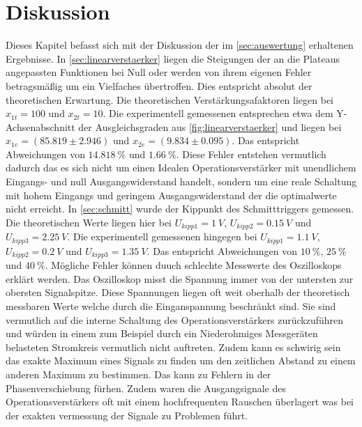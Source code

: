 

\section{Diskussion}
\label{sec:Diskussion}

Dieses Kapitel befasst sich mit der Diskussion der im \autoref{sec:auswertung} erhaltenen Ergebnisse.
In \autoref{sec:linearverstaerker} liegen die Steigungen der an die Plateaus angepassten Funktionen
bei Null oder werden von ihrem eigenen Fehler betragsmäßig um ein Vielfaches übertroffen. Dies entspricht
absolut der theoretischen Erwartung. Die theoretischen Verstärkungsafaktoren liegen bei $x_{1t}=100$ und
$x_{2t}=10$. Die experimentell gemessenen entsprechen etwa dem Y-Achsenabschnitt der Ausgleichsgraden aus
\autoref{fig:linearverstaerker} und liegen bei $x_{1e}=(85.819\pm 2.946)$ und $x_{2e}=(9.834 \pm 0.095)$.
Das entspricht Abweichungen von $\SI[]{14.818}[]{\%}$ und $\SI[]{1.66}[]{\%}$. Diese Fehler entstehen vermutlich
dadurch das es sich nicht um einen Idealen Operationsverstärker mit unendlichem Eingangs- und null 
Ausgangswiderstand handelt, sondern um eine reale Schaltung mit hohem Eingangs und geringem Ausgangswiderstand
der die optimalwerte nicht erreicht.
In \autoref{sec:schmitt} wurde der Kippunkt des Schmitttriggers gemessen.
Die theoretischen Werte liegen hier bei $U_{kipp1}=\SI[]{1}[]{V}$, $U_{kipp2}=\SI[]{0.15}[]{V}$ und $U_{kipp3}=\SI[]{2.25}[]{V}$.
Die experimentell gemessenen hingegen bei $U_{kipp1}=\SI[]{1.1}[]{V}$, $U_{kipp2}=\SI[]{0.2}[]{V}$ und $U_{kipp3}=\SI[]{1.35}[]{V}$.
Das entspricht Abweichungen von $\SI[]{10}[]{\%}$, $\SI[]{25}[]{\%}$ und $\SI[]{40}[]{\%}$. 
Mögliche Fehler können duuch schlechte Messwerte des Oszilloskops erklärt werden. Das Oszilloskop misst 
die Spannung immer von der untersten zur obersten Signalspitze. Diese Spannungen liegen oft weit oberhalb 
der theoretisch messbaren Werte welche durch die Einganspannung beschränkt sind. Sie sind vermutlich auf 
die interne Schaltung des Operationsverstärkers zurückzuführen und würden in einem zum Beispiel
durch ein Niederohmiges Messgeräten belasteten Stromkreis vermutlich nicht auftreten. Zudem kann es schwirig
sein das exakte Maximum eines Signals zu finden um den zeitlichen Abstand zu einem anderen Maximum zu bestimmen.
Das kann zu Fehlern in der Phasenverschiebung fürhen. Zudem waren die Ausgangsignale des Operationsverstärkers
oft mit einem hochfrequenten Rauschen überlagert was bei der exakten vermessung der Signale zu Problemen führt.
























